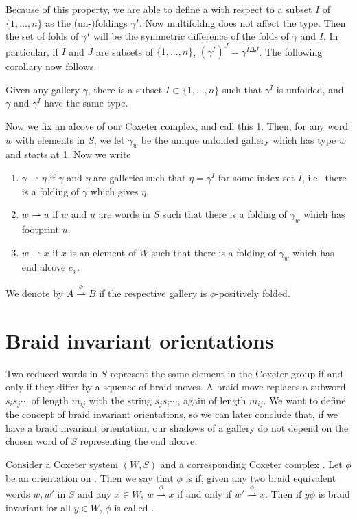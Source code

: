 \documentclass[11pt]{article}
\begin{document}
Because of this property, we are able to define a  with respect to a subset $I$ of $\{1,...,n\}$ as the (un-)foldings $\gamma^I$. Now multifoldng does not affect the type. Then the set of folds of $\gamma^I$ will be the symmetric difference of the folds of $\gamma$ and $I$. In particular, if $I$ and $J$ are subsets of $\{1,...,n\}$, $(\gamma^I)^J=\gamma^{I\Delta J}$. The following corollary now follows.

\begin{corollary}
    Given any gallery $\gamma$, there is a subset $I\subset \{1,...,n\}$ such that $\gamma^I$ is unfolded, and $\gamma$ and $\gamma^I$ have the same type.
\end{corollary}


Now we fix an alcove of our Coxeter complex, and call this 1. Then, for any word $w$ with elements in $S$, we let $\gamma_w$ be the unique unfolded gallery which has type $w$ and starts at 1. Now we write
\begin{enumerate}
    \item $\gamma \rightharpoonup \eta$ if $\gamma$ and $\eta$ are galleries such that $\eta = \gamma^I$ for some index set $I$, i.e.\ there is a folding of $\gamma$ which gives $\eta$.
    \item $w\rightharpoonup u$ if $w$ and $u$ are words in $S$ such that there is a folding of $\gamma_w$ which has footprint $u$.
    \item $w\rightharpoonup x$ if $x$ is an element of $W$ such that there is a folding of $\gamma_w$ which has end alcove $c_x$. 
\end{enumerate}
We denote by $A\stackrel{\phi}{\rightharpoonup} B$ if the respective gallery is $\phi$-positively folded.


\section{Braid invariant orientations}

Two reduced words in $S$ represent the same element in the Coxeter group if and only if they differ by a squence of braid moves. A braid move replaces a subword $s_is_j\cdots$ of length $m_{ij}$ with the string $s_js_i\cdots$, again of length $m_{ij}$. We want to define the concept of braid invariant orientations, so we can later conclude that, if we have a braid invariant orientation, our shadows of a gallery do not depend on the chosen word of $S$ representing the end alcove. 

\begin{definition}
    Consider a Coxeter system $(W,S)$ and a corresponding Coxeter complex \sg. Let $\phi$ be an orientation on \sg. Then we say that $\phi$ is  if, given any two braid equivalent words $w,w'$ in $S$ and any $x\in W$, $w\stackrel{\phi}{\rightharpoonup} x$ if and only if $w'\stackrel{\phi}{\rightharpoonup} x$. Then if $y\phi$ is braid invariant for all $y\in W$, $\phi$ is called . 
\end{definition}
\end{document}
